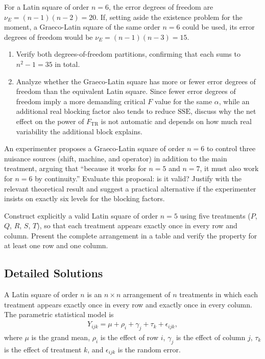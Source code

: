 \begin{problema}
\label{prob:68ab492}
For a Latin square of order $n=6$, the error degrees of freedom are $\nu_E=(n-1)(n-2)=20$. If, setting aside the existence problem for the moment, a Graeco-Latin square of the same order $n=6$ could be used, its error degrees of freedom would be $\nu_E=(n-1)(n-3)=15$.
\begin{enumerate}
\item Verify both degrees-of-freedom partitions, confirming that each sums to $n^2-1=35$ in total.
\item Analyze whether the Graeco-Latin square has more or fewer error degrees of freedom than the equivalent Latin square. Since fewer error degrees of freedom imply a more demanding critical $F$ value for the same $\alpha$, while an additional real blocking factor also tends to reduce $\text{SSE}$, discuss why the net effect on the power of $F_{\text{TR}}$ is not automatic and depends on how much real variability the additional block explains.
\end{enumerate}
\end{problema}

\begin{problema}
\label{prob:19cbc65}
An experimenter proposes a Graeco-Latin square of order $n=6$ to control three nuisance sources (shift, machine, and operator) in addition to the main treatment, arguing that ``because it works for $n=5$ and $n=7$, it must also work for $n=6$ by continuity.'' Evaluate this proposal: is it valid? Justify with the relevant theoretical result and suggest a practical alternative if the experimenter insists on exactly six levels for the blocking factors.
\end{problema}

\begin{problema}
\label{prob:c1de238}
Construct explicitly a valid Latin square of order $n=5$ using five treatments ($P$, $Q$, $R$, $S$, $T$), so that each treatment appears exactly once in every row and column. Present the complete arrangement in a table and verify the property for at least one row and one column.
\end{problema}

\subsection*{Detailed Solutions}

\begin{solproblema}[prob:e90018f]
A Latin square of order $n$ is an $n\times n$ arrangement of $n$ treatments in which each treatment appears exactly once in every row and exactly once in every column. The parametric statistical model is
\begin{align}
Y_{ijk}=\mu+\rho_i+\gamma_j+\tau_k+\epsilon_{ijk},
\end{align}
where $\mu$ is the grand mean, $\rho_i$ is the effect of row $i$, $\gamma_j$ is the effect of column $j$, $\tau_k$ is the effect of treatment $k$, and $\epsilon_{ijk}$ is the random error.
\end{solproblema}

